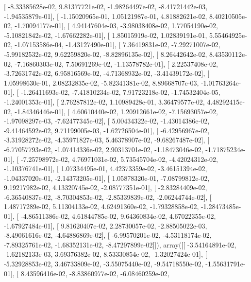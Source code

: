 \documentclass{article}
\begin{document}
       [ -8.33385628e-02,   9.81377721e-02,  -1.98264497e-02,
         -8.41721442e-03,  -1.94535879e-01],
       [ -1.15020965e-01,   1.05121987e-01,   4.81882621e-02,
          8.40210505e-02,  -1.70094177e-01],
       [  4.94147604e-03,  -3.98038408e-02,   1.77054190e-02,
         -5.10821842e-02,  -1.67662282e-01],
       [  1.85015919e-02,   1.02839191e-01,   5.55464925e-02,
         -1.07153586e-04,  -1.43127490e-01],
       [  7.36419831e-02,  -7.29271007e-02,  -5.99182532e-02,
          9.62259820e-02,  -8.82896135e-02],
       [  8.26442642e-02,   8.43530112e-02,  -7.16860303e-02,
          7.50691269e-02,  -1.13578782e-01],
       [  2.22537408e-02,  -3.72631742e-02,   6.95816569e-02,
         -4.71368932e-02,  -3.41439172e-02],
       [  1.05998630e-01,   2.08232835e-02,  -5.82341381e-02,
          8.89668707e-03,  -1.01763264e-01],
       [ -1.26411693e-02,  -7.41810234e-02,   7.91723218e-02,
         -1.74532404e-05,  -1.24001353e-01],
       [  2.76287812e-02,   1.10989428e-01,   3.36479577e-02,
          4.48292415e-02,  -1.84346446e-01],
       [  4.60610440e-02,   1.20912661e-02,  -7.15693057e-02,
         -1.97098297e-03,  -7.62477345e-02],
       [  5.00434322e-02,  -1.43014386e-02,  -9.41464592e-02,
          9.71199005e-03,  -1.62726504e-01],
       [ -6.42956967e-02,  -3.31928272e-02,  -4.35971827e-03,
          5.46378907e-02,  -9.68267487e-02],
       [ -6.77057793e-02,  -1.07414336e-02,   2.90313701e-02,
         -1.18473046e-02,  -1.71875234e-01],
       [ -7.25798972e-02,   4.76971031e-02,   5.73545704e-02,
         -4.42024312e-02,  -1.10376741e-01],
       [  1.07334495e-01,   4.42373359e-02,  -3.46151394e-02,
         -1.04337020e-01,  -2.14373205e-01],
       [  1.05878320e-01,  -7.08799812e-02,   9.19217982e-02,
          4.13320745e-02,  -2.08777351e-01],
       [ -2.83284409e-02,  -6.36540837e-02,  -8.70304853e-02,
         -2.85339839e-02,  -2.06244744e-02],
       [  1.48717289e-02,   5.11304133e-02,   4.62491360e-02,
         -1.79328858e-02,  -1.28473485e-01],
       [ -4.86511386e-02,   4.61844785e-02,   9.64360834e-02,
          4.67022355e-02,  -1.67927484e-01],
       [  9.81620407e-02,   2.28730057e-02,  -2.88505022e-03,
         -8.49061616e-02,  -4.64886869e-02],
       [ -6.99570201e-02,  -4.53118174e-02,  -7.89325761e-02,
         -1.68352131e-02,  -8.47297899e-02]]), array([[ -3.54164891e-02,  -1.62182133e-03,   3.69376382e-02,
          8.53330854e-02,  -1.32027424e-01],
       [ -5.32928853e-02,   3.46733809e-02,  -3.55075440e-02,
         -9.54718550e-02,  -1.55631791e-01],
       [  8.43596416e-02,  -8.83860977e-02,  -6.08460259e-02,
\end{document}
